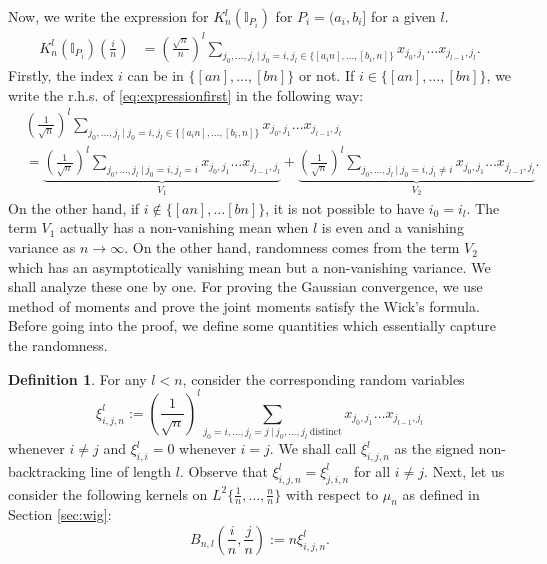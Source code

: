 \documentclass[reqno,12pt]{amsart}
\theoremstyle{plain}
\theoremstyle{definition}
\newtheorem{definition}{Definition}
\begin{document}
Now, we write the expression for $K_{n}^{l}(\mathbb{I}_{P_{i}})$ for $P_{i}=(a_{i},b_{i}]$ for a given $l$.
\begin{equation}\label{eq:expressionfirst}
    \begin{split}
        K_{n}^{l}(\mathbb{I}_{P_{i}})\left(\frac{i}{n}\right)&= \left(\frac{\sqrt{n}}{n}\right)^{l} \sum_{j_{0},\ldots, j_{l} ~|~ j_{0}=i, j_{l} \in \{ [a_{i}n],\ldots, [b_{i},n] \}} x_{j_{0},j_{1}}\ldots x_{j_{l-1},j_{l}}.
    \end{split}
\end{equation}
Firstly, the index $i$ can be in $\{[an],\ldots, [bn]\}$ or not. If $i \in \{[an],\ldots, [bn]\}$, we write the r.h.s. of \eqref{eq:expressionfirst} in the following way:
\begin{equation}
\begin{split}
   & \left( \frac{1}{\sqrt{n}} \right)^{l}\sum_{j_{0},\ldots, j_{l} ~|~ j_{0}=i, j_{l} \in \{ [a_{i}n],\ldots, [b_{i},n] \}} x_{j_{0},j_{1}}\ldots x_{j_{l-1},j_{l}}\\
   &=   \underbrace{\left( \frac{1}{\sqrt{n}} \right)^{l}\sum_{j_{0},\ldots, j_{l} ~|~ j_{0}=i, j_{l}=i }   x_{j_{0},j_{1}}\ldots x_{j_{l-1},j_{l}}}_{V_{1}} +  \underbrace{\left( \frac{1}{\sqrt{n}} \right)^{l}\sum_{j_{0},\ldots, j_{l} ~|~ j_{0}=i, j_{l}\neq i }  x_{j_{0},j_{1}}\ldots x_{j_{l-1},j_{l}}}_{V_{2}} .
\end{split}
\end{equation}
On the other hand, if $i \notin \{[an] ,\ldots [bn] \}$, it is not possible to have $i_{0}=i_{l}$. The term $V_{1}$ actually has a non-vanishing mean when $l$ is even and a vanishing variance as $n \to \infty$. On the other hand, randomness comes from the term $V_{2}$ which has an asymptotically vanishing mean but a non-vanishing variance. We shall analyze these one by one. For proving the Gaussian convergence, we use method of moments and prove the joint moments satisfy the Wick's formula. 
Before going into the proof, we define some quantities which essentially capture the randomness. 
\begin{definition}\label{def:nonback}
    For any $l < n$, consider the corresponding random variables 
    \[
     \xi_{i,j,n}^{l} := \left( \frac{1}{\sqrt{n}} \right)^{l} \sum_{j_{0}=i,\ldots, j_{l}=j~|~ j_{0},\ldots, j_{l} ~\text{distinct}} x_{j_{0},j_{1}} \ldots x_{j_{l-1},j_{l}}
    \]
    whenever $i \neq j$ and $\xi_{i,i}^{l}=0$ whenever $i=j$. We shall call $\xi_{i,j,n}^{l}$ as the signed non-backtracking line of length $l$. Observe that $\xi_{i,j,n}^{l}=\xi_{j,i,n}^{l}$ for all $i \neq j$. Next, let us consider the following kernels on $L^{2}\{\frac{1}{n}, \ldots, \frac{n}{n} \}$ with respect to $\mu_{n}$ as defined in Section \ref{sec:wig}: 
    \[
     B_{n,l}\left(\frac{i}{n}, \frac{j}{n}\right):= n \xi_{i,j,n}^{l}.
    \]
\end{definition}
\end{document}
